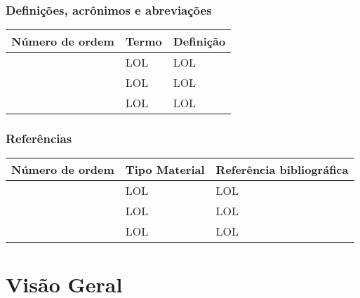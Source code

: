 \documentclass[12pt,a4paper]{article}
\begin{document}
        	
        	\subsubsection{Definições, acrônimos e abreviações}
        	        	\begin{table}[h]
        		        	\noindent\begin{tabular}{|p{}|p{}|p{}|}
        		        		\hline
        		        		\setcounter{Number}{0}
        		        		\textbf{Número de ordem} & \textbf{Termo} & \textbf{Definição} \\
        		        		\hline
        		        		\Item & LOL & LOL \\
        		        		\hline
        		        		\Item & LOL & LOL \\
        		        		\hline
        		        		\Item & LOL & LOL \\
        		        		\hline
        		        	\end{tabular}
        	        	\end{table}
        	        	
        	\subsubsection{Referências}
        	        	\begin{table}[!h]
        		        	\noindent\begin{tabular}{|p{}|p{}|p{}|}
        		        		\hline
        		        		\setcounter{Number}{0}
        		        		\textbf{Número de ordem} & \textbf{Tipo Material} & \textbf{Referência bibliográfica} \\
        		        		\hline
        		        		\Item & LOL & LOL \\
        		        		\hline
        		        		\Item & LOL & LOL \\
        		        		\hline
        		        		\Item & LOL & LOL \\
        		        		\hline
        		        	\end{tabular}
        	        	\end{table}	
        \clearpage
        \section{Visão Geral}
        
\end{document}
